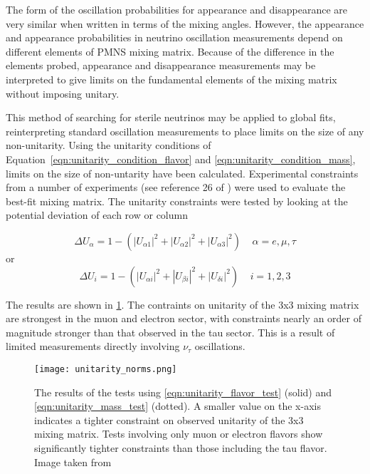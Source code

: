 The form of the oscillation probabilities for appearance and disappearance are very similar when written in terms of the mixing angles.
However, the appearance and appearance probabilities in neutrino oscillation measurements depend on different elements of PMNS mixing matrix.
Because of the difference in the elements probed, appearance and disappearance measurements may be interpreted to give limits on the fundamental elements of the mixing matrix without imposing unitary.

This method of searching for sterile neutrinos may be applied to global fits, reinterpreting standard oscillation measurements to place limits on the size of any non-unitarity.
Using the unitarity conditions of Equation~\ref{eqn:unitarity_condition_flavor} and \ref{eqn:unitarity_condition_mass}, limits on the size of non-untarity have been calculated\cite{Parke-Unitarity}.
Experimental constraints from a number of experiments (see reference 26 of \cite{Parke-Unitarity}) were used to evaluate the best-fit mixing matrix.
The unitarity constraints were tested by looking at the potential deviation of each row or column

\begin{equation}
	\Delta U_{\alpha} = 1 - \left( \left| U_{\alpha 1} \right|^2 +\left| U_{\alpha 2} \right|^2 +\left| U_{\alpha 3} \right|^2 \right) \;\;\;\; \alpha=e, \mu, \tau
\label{eqn:unitarity_flavor_test}
\end{equation}
or 
\begin{equation}
	\Delta U_{i} = 1 - \left( \left| U_{\alpha i} \right|^2 + \left| U_{\beta i} \right|^2 + \left| U_{\delta i} \right|^2 \right) \;\;\;\; i=1, 2, 3
\label{eqn:unitarity_mass_test}
\end{equation}

The results are shown in \ref{fig:unitarity_norms}.
The contraints on unitarity of the 3x3 mixing matrix are strongest in the muon and electron sector, with constraints nearly an order of magnitude stronger than that observed in the tau sector.
This is a result of limited measurements directly involving $\nu_\tau$ oscillations.

\begin{figure}[!h]%
	\centering
	\texttt{[image: unitarity\_norms.png]}%
	\caption{The results of the tests using \ref{eqn:unitarity_flavor_test} (solid) and \ref{eqn:unitarity_mass_test} (dotted). A smaller value on the x-axis indicates a tighter constraint on observed unitarity of the 3x3 mixing matrix. Tests involving only muon or electron flavors show significantly tighter constraints than those including the tau flavor.	Image taken from \cite{Parke-Unitarity}}
	\label{fig:unitarity_norms}
\end{figure}


